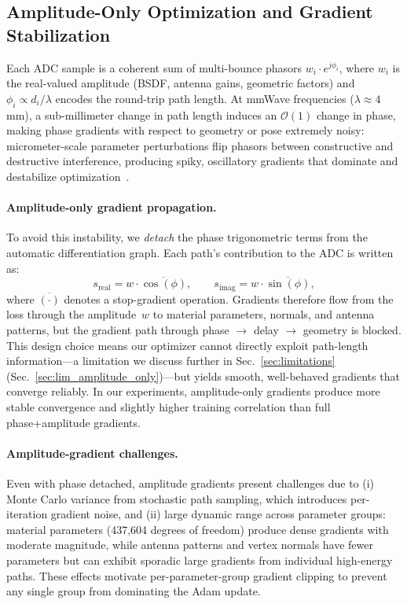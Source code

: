 
\subsection{Amplitude-Only Optimization and Gradient Stabilization}
\label{sec:phase_sensitivity_loss_landscape}

Each ADC sample is a coherent sum of multi-bounce phasors $w_i \cdot e^{j\phi_i}$, where $w_i$ is the real-valued amplitude (BSDF, antenna gains, geometric factors) and $\phi_i \propto d_i / \lambda$ encodes the round-trip path length. At mmWave frequencies ($\lambda \approx 4$\,mm), a sub-millimeter change in path length induces an $\mathcal{O}(1)$ change in phase, making phase gradients with respect to geometry or pose extremely noisy: micrometer-scale parameter perturbations flip phasors between constructive and destructive interference, producing spiky, oscillatory gradients that dominate and destabilize optimization~\cite{chen2025invertwin}.

\paragraph{Amplitude-only gradient propagation.}
To avoid this instability, we \emph{detach} the phase trigonometric terms from the automatic differentiation graph. Each path's contribution to the ADC is written as:
\begin{equation}
    s_\text{real} = w \cdot \overline{\cos(\phi)}, \qquad
    s_\text{imag} = w \cdot \overline{\sin(\phi)},
\end{equation}
where $\overline{(\cdot)}$ denotes a stop-gradient operation. Gradients therefore flow from the loss through the amplitude~$w$ to material parameters, normals, and antenna patterns, but the gradient path through phase $\to$ delay $\to$ geometry is blocked. This design choice means our optimizer cannot directly exploit path-length information---a limitation we discuss further in Sec.~\ref{sec:limitations} (Sec.~\ref{sec:lim_amplitude_only})---but yields smooth, well-behaved gradients that converge reliably. In our experiments, amplitude-only gradients produce more stable convergence and slightly higher training correlation than full phase+amplitude gradients.

\paragraph{Amplitude-gradient challenges.}
Even with phase detached, amplitude gradients present challenges due to (i) Monte Carlo variance from stochastic path sampling, which introduces per-iteration gradient noise, and (ii) large dynamic range across parameter groups: material parameters (437,604 degrees of freedom) produce dense gradients with moderate magnitude, while antenna patterns and vertex normals have fewer parameters but can exhibit sporadic large gradients from individual high-energy paths. These effects motivate per-parameter-group gradient clipping to prevent any single group from dominating the Adam update.

